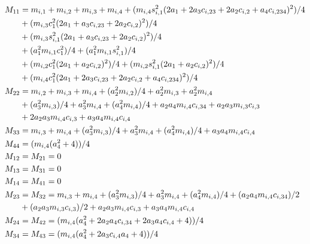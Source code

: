 	\begin{equation*}
		\begin{split}\small
		M_{11}  & = m_{i,1} + m_{i,2} + m_{i,3} + m_{i,4} + (m_{i,4} s_{i,1}^2 (2 a_{1} + 2 a_{3} c_{i,23} + 2 a_{2} c_{i,2} + a_{4} c_{i,234})^2)/4 \\
				& + (m_{i,3} c_{1}^2 (2 a_{1} + a_{3} c_{i,23} + 2 a_{2} c_{i,2})^2)/4 \\ 
				& + (m_{i,3} s_{i,1}^2 (2 a_{1} + a_{3} c_{i,23} + 2 a_{2} c_{i,2})^2)/4 \\
				& + (a_{1}^2 m_{i,1} c_{1}^2)/4 + (a_{1}^2 m_{i,1} s_{i,1}^2)/4  \\
				& + (m_{i,2} c_{1}^2 (2 a_{1} + a_{2} c_{i,2})^2)/4 + (m_{i,2} s_{i,1}^2 (2 a_{1} + a_{2} c_{i,2})^2)/4 \\
				& + (m_{i,4} c_{1}^2 (2 a_{1} + 2 a_{3} c_{i,23} + 2 a_{2} c_{i,2} + a_{4} c_{i,234})^2)/4 \\
		M_{22}  & = m_{i,2} + m_{i,3} + m_{i,4} + (a_{2}^2 m_{i,2})/4 + a_{2}^2 m_{i,3} + a_{2}^2 m_{i,4} \\
				& + (a_{3}^2 m_{i,3})/4 + a_{3}^2 m_{i,4} + (a_{4}^2 m_{i,4})/4 + a_{2} a_{4} m_{i,4} c_{i,34} + a_{2} a_{3} m_{i,3} c_{i,3} \\
				& + 2 a_{2} a_{3} m_{i,4} c_{i,3} + a_{3} a_{4} m_{i,4} c_{i,4}\\
		M_{33}  & = m_{i,3} + m_{i,4} + (a_{3}^2 m_{i,3})/4 + a_{3}^2 m_{i,4} + (a_{4}^2 m_{i,4})/4 + a_{3} a_{4} m_{i,4} c_{i,4}\\
		M_{44}  & = (m_{i,4} (a_{4}^2 + 4))/4\\
		M_{12}  & = M_{21} = 0\\
		M_{13}  & = M_{31} = 0\\
		M_{14}  & = M_{41} = 0\\
		M_{23}  & = M_{32} = m_{i,3} + m_{i,4} + (a_{3}^2 m_{i,3})/4 + a_{3}^2 m_{i,4} + (a_{4}^2 m_{i,4})/4 + (a_{2} a_{4} m_{i,4} c_{i,34})/2 \\
				& + (a_{2} a_{3} m_{i,3} c_{i,3})/2 + a_{2} a_{3} m_{i,4} c_{i,3} + a_{3} a_{4} m_{i,4} c_{i,4} \\
		M_{24}  & = M_{42} = (m_{i,4} (a_{4}^2 + 2 a_{2} a_{4} c_{i,34} + 2 a_{3} a_{4} c_{i,4} + 4))/4\\
		M_{34} 	& = M_{43} = (m_{i,4} (a_{4}^2 + 2 a_{3} c_{i,4} a_{4} + 4))/4
		\end{split}
	\end{equation*}


